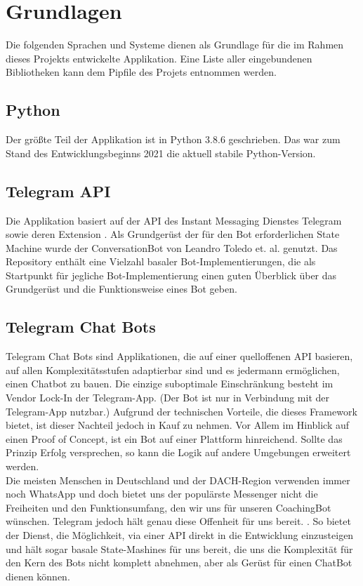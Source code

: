 \label{Grundlagen}
\chapter{Grundlagen}
    Die folgenden Sprachen und Systeme dienen als Grundlage für die im Rahmen dieses Projekts entwickelte Applikation. Eine Liste aller eingebundenen Bibliotheken kann dem Pipfile des Projets entnommen werden. 

    \section{Python}
        Der größte Teil der Applikation ist in Python 3.8.6 \cite{python3.8.6} geschrieben. Das war zum Stand des Entwicklungsbeginns 2021 die aktuell stabile Python-Version.

    \section{Telegram API}
        Die Applikation basiert auf der API des Instant Messaging Dienstes Telegram \cite{telegramAPI} sowie deren Extension \cite{telegramAPIext}.
        Als Grundgerüst der für den Bot erforderlichen State Machine wurde der ConversationBot von Leandro Toledo et. al. genutzt. \cite{conversationBot} Das Repository enthält eine Vielzahl basaler Bot-Implementierungen, die als Startpunkt für jegliche Bot-Implementierung einen guten Überblick über das Grundgerüst und die Funktionsweise eines Bot geben.

    \section{Telegram Chat Bots}
        Telegram Chat Bots sind Applikationen, die auf einer quelloffenen API \cite{telegramAPI} basieren, auf allen Komplexitätsstufen adaptierbar sind und es jedermann ermöglichen, einen Chatbot zu bauen. Die einzige suboptimale Einschränkung besteht im Vendor Lock-In der Telegram-App. (Der Bot ist nur in Verbindung mit der Telegram-App \cite{telegram} nutzbar.) Aufgrund der technischen Vorteile, die dieses Framework bietet, ist dieser Nachteil jedoch in Kauf zu nehmen. Vor Allem im Hinblick auf einen Proof of Concept, ist ein Bot auf einer Plattform hinreichend. Sollte das Prinzip Erfolg versprechen, so kann die Logik auf andere Umgebungen erweitert werden. \\
        Die meisten Menschen in Deutschland und der DACH-Region verwenden immer noch WhatsApp \cite{Nutzerzahlen} und doch bietet uns der populärste Messenger nicht die Freiheiten und den Funktionsumfang, den wir uns für unseren CoachingBot wünschen. Telegram jedoch hält genau diese Offenheit für uns bereit. \cite{telegramVergleich}. So bietet der Dienst, die Möglichkeit, via einer API direkt in die Entwicklung einzusteigen und hält sogar basale State-Mashines für uns bereit, die uns die Komplexität für den Kern des Bots nicht komplett abnehmen, aber als Gerüst für einen ChatBot dienen können.


